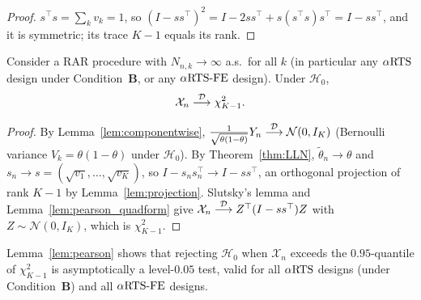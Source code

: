 \begin{proof}\leanok
$s^\top s = \sum_k v_k = 1$, so $(I-ss^\top)^2 = I - 2ss^\top + s(s^\top s)s^\top
 = I - ss^\top$, and it is symmetric; its trace $K-1$ equals its rank.
\end{proof}

\begin{lemma}\label{lem:pearson}
Consider a RAR procedure with $N_{n,k}\to\infty$ a.s.\ for all $k$ (in
particular any $\alpha\text{RTS}$ design under Condition~\textbf{B}, or any $\alpha\text{RTS-FE}$
design). Under $\mathcal{H}_0$,
\[
  \mathcal{X}_n \overset{\mathcal{D}}{\longrightarrow} \chi^2_{K-1}.
\]
\end{lemma}

\begin{proof}
By Lemma~\ref{lem:componentwise}, $\frac{1}{\sqrt{\theta(1-\theta)}}Y_n
\overset{\mathcal{D}}{\longrightarrow}\mathcal{N}(0,I_K)$ (Bernoulli variance $V_k=\theta(1-\theta)$ under
$\mathcal{H}_0$). By Theorem~\ref{thm:LLN}, $\tilde{\theta}_n\to\theta$ and
$s_n\to s=(\sqrt{v_1},\dots,\sqrt{v_K})$, so $I-s_ns_n^\top\to I-ss^\top$, an
orthogonal projection of rank $K-1$ by Lemma~\ref{lem:projection}. Slutsky's
lemma and Lemma~\ref{lem:pearson_quadform} give
$\mathcal{X}_n\overset{\mathcal{D}}{\longrightarrow} Z^\top(I-ss^\top)Z$ with $Z\sim\mathcal{N}(0,I_K)$, which is
$\chi^2_{K-1}$.
\end{proof}

\begin{remark}\label{rem:test_level}
Lemma~\ref{lem:pearson} shows that rejecting $\mathcal{H}_0$ when $\mathcal{X}_n$
exceeds the $0.95$-quantile of $\chi^2_{K-1}$ is asymptotically a level-$0.05$
test, valid for all $\alpha\text{RTS}$ designs (under Condition~\textbf{B}) and all
$\alpha\text{RTS-FE}$ designs.
\end{remark}
